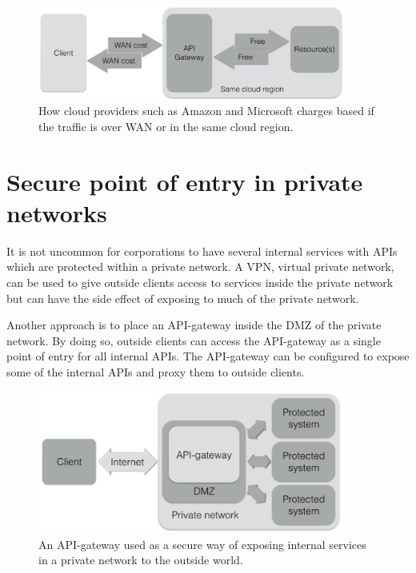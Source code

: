 \documentclass{cslthse-msc}
\begin{document}
\begin{figure}[H]
  \centering
    \begin{center}
      \includegraphics[width=0.9\textwidth]{images/api_gateway_bandwidth.png}
    \end{center}
  \caption{How cloud providers such as Amazon\cite{cloud_amazon} and Microsoft\cite{cloud_microsoft} charges based if the traffic is over WAN or in the same cloud region.}
\end{figure}

\section{Secure point of entry in private networks}
It is not uncommon for corporations to have several internal services with APIs which are protected within a private network. A VPN, virtual private network, can be used to give outside clients access to services inside the private network but can have the side effect of exposing to much of the private network.

Another approach is to place an API-gateway inside the DMZ of the private network. By doing so, outside clients can access the API-gateway as a single point of entry for all internal APIs. The API-gateway can be configured to expose some of the internal APIs and proxy them to outside clients.

\begin{figure}[H]
  \centering
    \begin{center}
      \includegraphics[width=0.9\textwidth]{images/api_gateway_dmz.png}
    \end{center}
  \caption{An API-gateway used as a secure way of exposing internal services in a private network to the outside world.}
\end{figure}
\end{document}
